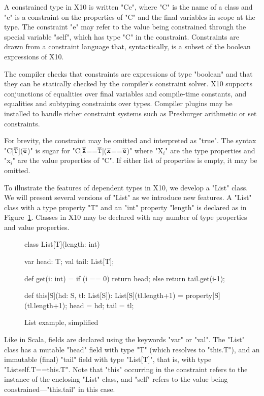 \documentclass[preprint,nocopyrightspace,9pt]{sigplanconf}
\newcommand\tbar[1]{\ensuremath{\bar{\tt {#1}}}}
\begin{document}
A constrained type in X10 is written \xcd"C{e}", where \xcd"C" is the
name of a class and \xcd"e" is a constraint on the properties of
\xcd"C" and the final variables in scope at the type.  The
constraint \xcd"e" may refer to the value being constrained
through the special variable \xcd"self", which has type \xcd"C"
in the constraint.  Constraints are drawn from a constraint
language that, syntactically, is a subset of the boolean
expressions of X10.

The compiler checks that constraints are expressions
of type \xcd"boolean" and that they can be statically checked by
the compiler's constraint solver.  
X10 supports conjunctions of equalities
over final variables and compile-time constants, and equalities
and subtyping constraints over types.
Compiler plugins may be installed to
handle richer constraint systems such as Presburger arithmetic
or set constraints.

For brevity, the constraint may be omitted and
interpreted as \xcd"true".
The syntax
\xcdmath"C[$\tbar{T}$]($\tbar{e}$)" is sugar for
\xcdmath"C[$\tbar{X}$==$\tbar{T}$]($\tbar{x}$==$\tbar{e}$)"
where \xcd"X$_i$" are the type properties and \xcd"x$_i$" are the
value properties of \xcd"C".
If either list of properties is empty, it may be omitted.

To illustrate the features of dependent types in X10, we develop a \xcd"List"
class.  We will present several versions of \xcd"List" as we
introduce new features.
A \xcd"List" class with a type property \xcd"T" and an \xcd"int"
property \xcd"length" is declared as in Figure~\ref{fig:list0}.
Classes in X10 may be declared with any number of type properties and
value properties.

\begin{figure}
\begin{xtennoindent}
class List[T](length: int) {
  var head: T;
  val tail: List[T];

  def get(i: int) = {
    if (i == 0) return head;
    else return tail.get(i-1);
  }

  def this[S](hd: S, tl: List[S]): List[S](tl.length+1) = {
    property[S](tl.length+1);
    head = hd; tail = tl;
  }
}
\end{xtennoindent}
\caption{List example, simplified}
\label{fig:list0}
\end{figure}

Like in Scala, fields are declared using the keywords \xcd"var"
or \xcd"val".  The \xcd"List" class has a mutable \xcd"head"
field with type \xcd"T" (which resolves to \xcd"this.T"), and an
immutable (final) \xcd"tail" field with type \xcd"List[T]", that
is, with type \xcd"List{self.T==this.T}".  Note that \xcd"this" occurring
in the constraint refers to the instance of the enclosing
\xcd"List" class,
and \xcd"self" refers to the value being
constrained---\xcd"this.tail" in this case.
\end{document}
